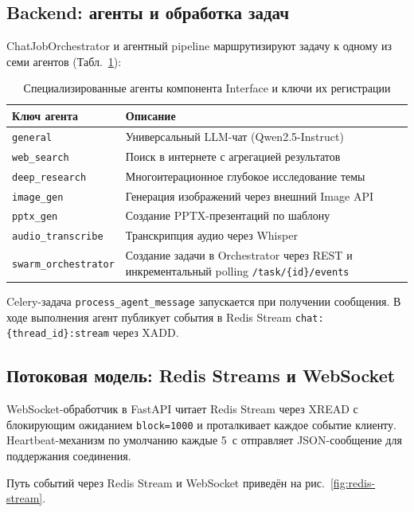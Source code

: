 \documentclass[14pt,a4paper]{extreport}
\begin{document}
\subsection{Backend: агенты и обработка задач}

ChatJobOrchestrator и агентный pipeline маршрутизируют задачу к одному из семи агентов (Табл.~\ref{tab:iface-agents}):

\begin{table}[H]
\caption{Специализированные агенты компонента Interface и ключи их регистрации}
\label{tab:iface-agents}
\begin{tabular}{p{4.7cm}p{8.3cm}}
\toprule
\textbf{Ключ агента} & \textbf{Описание} \\
\midrule
\texttt{general} & Универсальный LLM-чат (Qwen2.5-Instruct) \\
\texttt{web\_search} & Поиск в интернете с агрегацией результатов \\
\texttt{deep\_research} & Многоитерационное глубокое исследование темы \\
\texttt{image\_gen} & Генерация изображений через внешний Image API \\
\texttt{pptx\_gen} & Создание PPTX-презентаций по шаблону \\
\texttt{audio\_transcribe} & Транскрипция аудио через Whisper \\
\texttt{swarm\_orchestrator} & Создание задачи в Orchestrator через REST и инкрементальный polling \texttt{/task/\{id\}/events} \\
\bottomrule
\end{tabular}
\end{table}

Celery-задача \texttt{process\_agent\_message} запускается при получении сообщения. В ходе выполнения агент публикует события в Redis Stream \texttt{chat:\{thread\_id\}:stream} через XADD.

\subsection{Потоковая модель: Redis Streams и WebSocket}

WebSocket-обработчик в FastAPI читает Redis Stream через XREAD с блокирующим ожиданием \texttt{block=1000} и проталкивает каждое событие клиенту. Heartbeat-механизм по умолчанию каждые 5~с отправляет JSON-сообщение для поддержания соединения.

Путь событий через Redis Stream и WebSocket приведён на рис.~\ref{fig:redis-stream}.
\end{document}
